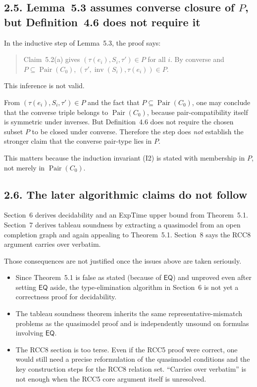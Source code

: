 \documentclass[11pt]{article}
\newcommand{\role}[1]{\ensuremath{\mathsf{#1}}}
\newcommand{\EQ}{\role{EQ}}
\newcommand{\Pair}{\operatorname{Pair}}
\begin{document}
\subsection*{2.5. Lemma~5.3 assumes converse closure of $P$, but Definition~4.6 does not require it}

In the inductive step of Lemma~5.3, the proof says:
\begin{quote}
Claim~5.2(a) gives $(\tau(e_i),S_i,\tau') \in P$ for all $i$. By converse and $P \subseteq \Pair(C_0)$, $(\tau',\operatorname{inv}(S_i),\tau(e_i)) \in P$.
\end{quote}
This inference is not valid.

From $(\tau(e_i),S_i,\tau') \in P$ and the fact that $P \subseteq \Pair(C_0)$, one may conclude that the converse triple belongs to $\Pair(C_0)$, because pair-compatibility itself is symmetric under inverses. But Definition~4.6 does not require the chosen subset $P$ to be closed under converse. Therefore the step does \emph{not} establish the stronger claim that the converse pair-type lies in $P$.

This matters because the induction invariant (I2) is stated with membership in $P$, not merely in $\Pair(C_0)$.

\subsection*{2.6. The later algorithmic claims do not follow}

Section~6 derives decidability and an ExpTime upper bound from Theorem~5.1. Section~7 derives tableau soundness by extracting a quasimodel from an open completion graph and again appealing to Theorem~5.1. Section~8 says the RCC8 argument carries over verbatim.

Those consequences are not justified once the issues above are taken seriously.

\begin{itemize}
    \item Since Theorem~5.1 is false as stated (because of $\EQ$) and unproved even after setting $\EQ$ aside, the type-elimination algorithm in Section~6 is not yet a correctness proof for decidability.
    \item The tableau soundness theorem inherits the same representative-mismatch problems as the quasimodel proof and is independently unsound on formulas involving $\EQ$.
    \item The RCC8 section is too terse. Even if the RCC5 proof were correct, one would still need a precise reformulation of the quasimodel conditions and the key construction steps for the RCC8 relation set. ``Carries over verbatim'' is not enough when the RCC5 core argument itself is unresolved.
\end{itemize}
\end{document}
